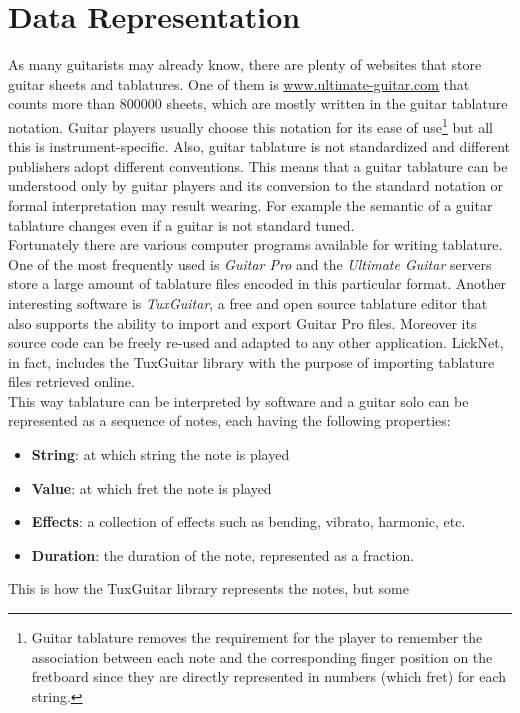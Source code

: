 \documentclass{llncs}
\begin{document}
\section{Data Representation}
As many guitarists may already know, there are plenty of websites that
store guitar sheets and tablatures. One of them is \url{www.ultimate-guitar.com}
that counts more than 800000 sheets, which are mostly written
in the guitar tablature notation. Guitar players usually choose this
notation for its ease of use\footnote{Guitar tablature removes the
requirement for the player to remember the association between each
note and the corresponding finger position on the fretboard since they are directly
represented in numbers (which fret) for each string.}
but all this is instrument-specific. Also, guitar tablature is not standardized and
different publishers adopt different conventions. 
This means that a
guitar tablature can be understood only by guitar players and its
conversion to the standard notation or formal interpretation may result
wearing. 
For example the semantic of a guitar tablature changes even if
a guitar is not standard tuned.\\
Fortunately there are various computer programs available for writing
tablature. One of the most frequently used is \emph{Guitar Pro} and the
\emph{Ultimate
Guitar} servers store a large amount of tablature files encoded in this particular format.
Another interesting software is \emph{TuxGuitar}, a free and open source
tablature editor that also supports the ability to import and export
Guitar Pro files\cite{tuxguitar}. Moreover its source code can be freely
re-used and adapted to any other application. LickNet, in fact, includes
the TuxGuitar library with the purpose of importing tablature files retrieved
online.\\
This way tablature can be interpreted by software and a guitar solo
can be represented as a sequence of notes, each having the following properties:
\begin{itemize}
	\item \textbf{String}: at which string the note is played
	\item \textbf{Value}: at which fret the note is played
	\item \textbf{Effects}: a collection of effects such as bending, vibrato,
		harmonic, etc.
	\item \textbf{Duration}: the duration of the note, represented
as a fraction.
\end{itemize}
This is how the TuxGuitar library represents the notes, but some
\end{document}
